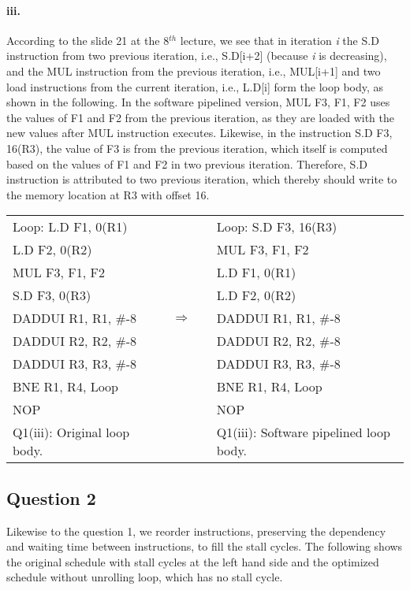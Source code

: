 \documentclass[11pt]{article}
\newcommand{\q}[1]{\subsection*{Question {#1}}}
\renewcommand{\part}[1]{\paragraph*{{#1}.}}
\newcommand{\code}[1]{\textsf{#1}}
\begin{document}
\part{iii} According to the slide 21 at the 8$^{th}$ lecture, we see that in iteration \textit{i} the \code{S.D} instruction from two previous iteration, i.e., \code{S.D[i+2]} (because \textit{i} is decreasing), and the \code{MUL} instruction from the previous iteration, i.e., \code{MUL[i+1]} and two load instructions from the current iteration, i.e., \code{L.D[i]} form the loop body, as shown in the following. In the software pipelined version, \code{MUL F3, F1, F2} uses the values of \code{F1} and \code{F2} from the previous iteration, as they are loaded with the new values after \code{MUL} instruction executes. Likewise, in the instruction \code{S.D F3, 16(R3)}, the value of \code{F3} is from the previous iteration, which itself is computed based on the values of \code{F1} and \code{F2} in two previous iteration. Therefore, \code{S.D} instruction is attributed to two previous iteration, which thereby should write to the memory location at \code{R3} with offset 16.

\begin{table}[h]
\center
\begin{tabular}{lcccl}
	  \code{Loop:} \code{L.D F1, 0(R1)} & & & &  \code{Loop:} \code{S.D F3, 16(R3)} \\
	 \code{L.D F2, 0(R2)}  & & & & \code{MUL F3, F1, F2}\\
	 \code{MUL F3, F1, F2}  & & & & \code{L.D F1, 0(R1)} \\
	 \code{S.D F3, 0(R3)} & & & & \code{L.D F2, 0(R2)} \\
	 \code{DADDUI R1, R1, \#-8} & & $\Rightarrow$ & & \code{DADDUI R1, R1, \#-8} \\
	 \code{DADDUI R2, R2, \#-8} & & & & \code{DADDUI R2, R2, \#-8} \\
	 \code{DADDUI R3, R3, \#-8} & & & & \code{DADDUI R3, R3, \#-8} \\
	 \code{BNE R1, R4, Loop} & & & & \code{BNE R1, R4, Loop} \\ 
	 \code{NOP} & & & & \code{NOP} \\
	 Q1(iii): Original loop body. & & & & Q1(iii): Software pipelined loop body.
\end{tabular}
\label{tbl:q1p3}
\end{table}

\q{2} Likewise to the question 1, we reorder instructions, preserving the dependency and waiting time between instructions, to fill the stall cycles. The following shows the original schedule with stall cycles at the left hand side and the optimized schedule without unrolling loop, which has no stall cycle. 
\end{document}
